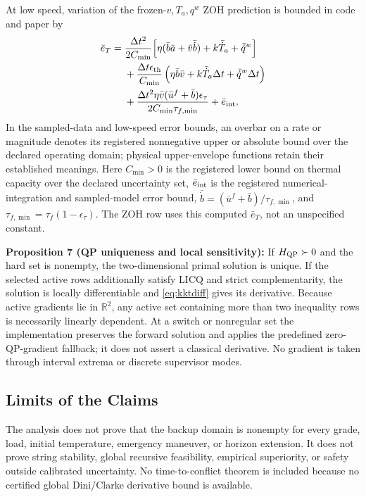 At low speed, variation of the frozen-$v,T_a,q^w$ ZOH prediction is bounded in code and paper by
\begin{align}
\bar e_T={}&\frac{\Delta t^2}{2C_{\min}}\!\left[\eta(\bar b\bar a+\bar v\bar{\dot b})+k\bar{\dot T}_a+\bar{\dot q}^w\right]\nonumber\\
&+\frac{\Delta t\epsilon_{\rm th}}{C_{\min}}\left(\eta\bar b\bar v+k\bar{\dot T}_a\Delta t+\bar{\dot q}^w\Delta t\right)\nonumber\\
&+\frac{\Delta t^2\eta\bar v(\bar u^f+\bar b)\epsilon_\tau}{2C_{\min}\tau_{f,\min}}+\bar e_{\rm int},\label{eq:zoherror}
\end{align}
In the sampled-data and low-speed error bounds, an overbar on a rate or magnitude denotes its registered nonnegative upper or absolute bound over the declared operating domain; physical upper-envelope functions retain their established meanings. Here $C_{\min}>0$ is the registered lower bound on thermal capacity over the declared uncertainty set, $\bar e_{\rm int}$ is the registered numerical-integration and sampled-model error bound, $\bar{\dot b}=(\bar u^f+\bar b)/\tau_{f,\min}$, and $\tau_{f,\min}=\tau_f(1-\epsilon_\tau)$. The ZOH row uses this computed $\bar e_T$, not an unspecified constant.

\textbf{Proposition 7 (QP uniqueness and local sensitivity):} If $H_{\rm QP}\succ0$ and the hard set is nonempty, the two-dimensional primal solution is unique. If the selected active rows additionally satisfy LICQ and strict complementarity, the solution is locally differentiable and \eqref{eq:kktdiff} gives its derivative. Because active gradients lie in $\mathbb R^2$, any active set containing more than two inequality rows is necessarily linearly dependent. At a switch or nonregular set the implementation preserves the forward solution and applies the predefined zero-QP-gradient fallback; it does not assert a classical derivative. No gradient is taken through interval extrema or discrete supervisor modes.

\subsection{Limits of the Claims}
The analysis does not prove that the backup domain is nonempty for every grade, load, initial temperature, emergency maneuver, or horizon extension. It does not prove string stability, global recursive feasibility, empirical superiority, or safety outside calibrated uncertainty. No time-to-conflict theorem is included because no certified global Dini/Clarke derivative bound is available.
